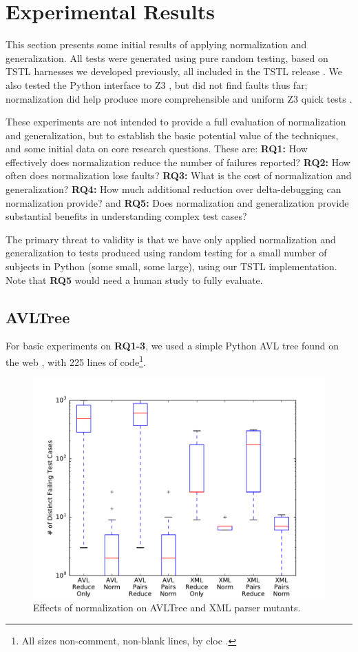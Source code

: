 \section {Experimental Results}

This section presents some initial results of applying normalization
and generalization.  All tests were generated using pure random testing,
based on TSTL harnesses we developed previously, all included in the
TSTL release \cite{tstl}.  We also tested the
Python interface to Z3 \cite{z3}, but did not find faults thus far;
normalization did help produce more comprehensible and uniform Z3
quick tests \cite{icst2014}.

These experiments are not intended to provide a full evaluation of
normalization and generalization, but to establish the basic potential
value of
the techniques, and some initial data on core research questions.
These are:
{\bf RQ1:} How effectively does normalization reduce the number of
failures reported? {\bf RQ2:} How often does normalization lose
faults? {\bf RQ3:} What is the cost of normalization and generalization? {\bf RQ4:} How
much additional reduction over delta-debugging can normalization
provide? and {\bf RQ5:} Does normalization and generalization provide
substantial benefits in understanding complex test cases?

The primary
threat to validity is that we have only applied normalization and
generalization to tests produced using random testing for a small
number of subjects in Python (some small, some large), using our TSTL
implementation.  Note that {\bf RQ5} would need a human study to fully evaluate.

\subsection{AVLTree}

For basic experiments on {\bf RQ1-3}, we used a
simple Python AVL tree found on the web
\cite{avltree}, with 225 lines of code\footnote{All sizes non-comment, non-blank lines, by cloc \cite{cloc}.}.

\begin{figure}
\includegraphics[width=\columnwidth]{length}
\caption{Effects of normalization on AVLTree and XML parser mutants.}
\label{normeffect}
\end{figure}

